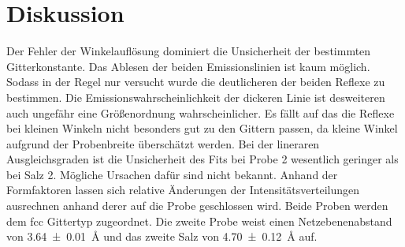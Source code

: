 \section{Diskussion}\label{sec:Diskussion}
Der Fehler der Winkelauflösung  dominiert die Unsicherheit der bestimmten
Gitterkonstante. 
Das Ablesen der beiden Emissionslinien ist kaum möglich. 
Sodass in der Regel nur versucht wurde die deutlicheren der beiden Reflexe zu 
bestimmen.
Die Emissionswahrscheinlichkeit der dickeren Linie ist desweiteren auch
ungefähr eine Größenordnung wahrscheinlicher. 
Es fällt auf das die Reflexe bei kleinen Winkeln nicht besonders gut zu den
Gittern passen, da kleine Winkel aufgrund der Probenbreite überschätzt werden.
Bei der lineraren Ausgleichsgraden ist die Unsicherheit des Fits bei Probe 2 
wesentlich geringer als bei Salz 2. 
Mögliche Ursachen dafür sind nicht bekannt. 
Anhand der Formfaktoren lassen sich relative Änderungen der Intensitätsverteilungen ausrechnen
anhand derer auf die Probe geschlossen wird.
Beide Proben werden dem fcc Gittertyp zugeordnet. 
Die zweite Probe weist einen Netzebenenabstand von \SI{3.64 +- 0.01}{\angstrom}
und das zweite Salz von \SI{4.70 +- 0.12}{\angstrom} auf.
